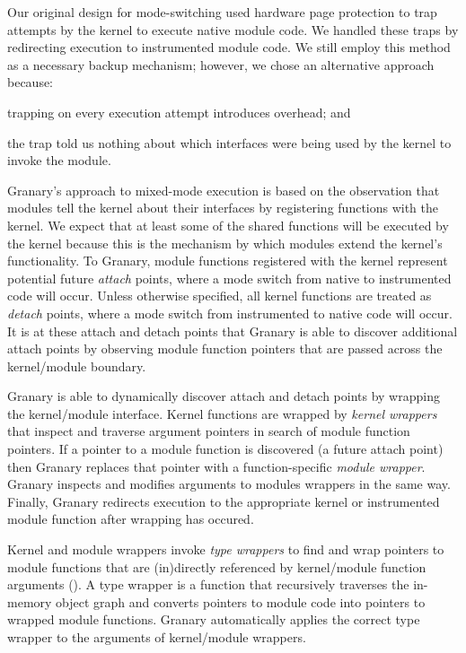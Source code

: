 \documentclass[preprint]{sigplanconf}
\newcommand{\comment}[1]{}
\begin{document}
Our original design for mode-switching used hardware page protection to trap attempts by the kernel to execute native module code. We handled these traps by redirecting execution to instrumented module code. We still employ this method as a necessary backup mechanism; however, we chose an alternative approach because: \begin{inparaenum}[i)]
	\item trapping on every execution attempt introduces overhead\comment{TODO: CITE eval section with wrappers disabled!!!}; and
	\item the trap told us nothing about which interfaces were being used by the kernel to invoke the module.
\end{inparaenum}

Granary's approach to mixed-mode execution is based on the observation that modules tell the kernel about their interfaces by registering functions with the kernel. We expect that at least some of the shared functions will be executed by the kernel because this is the mechanism by which modules extend the kernel's functionality. To Granary, module functions registered with the kernel represent potential future \emph{attach} points, where a mode switch from native to instrumented code will occur. Unless otherwise specified, all kernel functions are treated as \emph{detach} points, where a mode switch from instrumented to native code will occur. It is at these attach and detach points that Granary is able to discover additional attach points by observing module function pointers that are passed across the kernel/module boundary.

Granary is able to dynamically discover attach and detach points by wrapping the kernel/module interface. Kernel functions are wrapped by \emph{kernel wrappers} that inspect and traverse argument pointers in search of module function pointers. If a pointer to a module function is discovered (a future attach point) then Granary replaces that pointer with a function-specific \emph{module wrapper}. Granary inspects and modifies arguments to modules wrappers in the same way. Finally, Granary redirects execution to the appropriate kernel or instrumented module function after wrapping has occured.

Kernel and module wrappers invoke \emph{type wrappers} to find and wrap pointers to module functions that are (in)directly referenced by kernel/module function arguments (). A type wrapper is a function that recursively  traverses the in-memory object graph and converts pointers to module code into pointers to wrapped module functions.  Granary automatically applies the correct type wrapper to the arguments of kernel/module wrappers.
\end{document}
